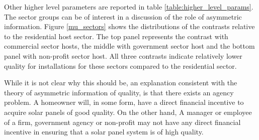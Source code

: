 \documentclass[12pt]{article}
\begin{document}
Other higher level parameters are reported in table \ref{table:higher_level_params}. The sector groups can be of interest in a discussion of the role of asymmetric information. Figure \ref{mu_sectors} shows the distributions of the contrasts relative to the residential host sector. The top panel represents the contrast with commercial sector hosts, the middle with government sector host and the bottom panel with non-profit sector host. All three contrasts indicate relatively lower quality for installations for these sectors compared to the residential sector.

While it is not clear why this should be, an explanation consistent with the theory of asymmetric information of quality, is that there exists an agency problem. A homeowner will, in some form, have a direct financial incentive to acquire solar panels of good quality. On the other hand, A manager or employee of a firm, government agency or non-profit may not have any direct financial incentive in ensuring that a solar panel system is of high quality.
\end{document}
